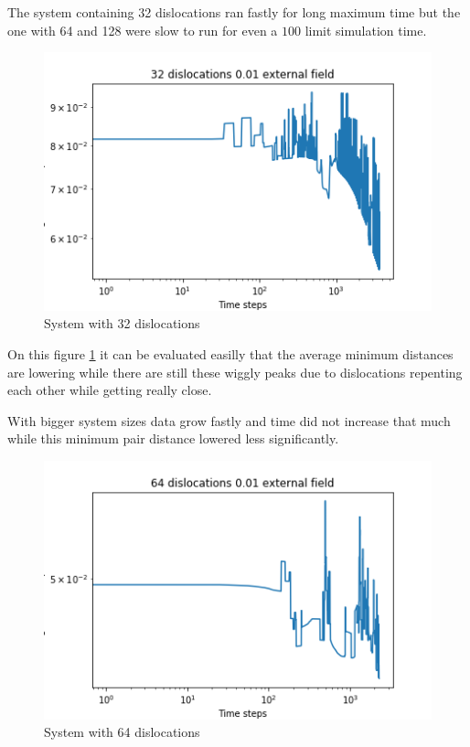 \documentclass[12pt,a4paper]{article}
\theoremstyle{plain}
\begin{document}
\begin{multicols*}{2}
	\par The system containing 32 dislocations ran fastly for long maximum time but the one with 64 and 128 were slow to run
	for even a $100$ limit simulation time.

	\begin{figure}[H]
		\centering
		\includegraphics[width=0.8\columnwidth]{./32.png}
		\caption{System with 32 dislocations}
		\label{fig:32}
	\end{figure}

	\par On this figure \ref{fig:32} it can be evaluated easilly that the average minimum distances
	are lowering while there are still these wiggly peaks due to dislocations repenting each other while
	getting really close.

	\par With bigger system sizes data grow fastly and time did not increase that much while this
	minimum pair distance lowered less significantly.

	\begin{figure}[H]
		\centering
		\includegraphics[width=0.8\columnwidth]{./64.png}
		\caption{System with 64 dislocations}
	\end{figure}


\end{multicols*}
\end{document}
